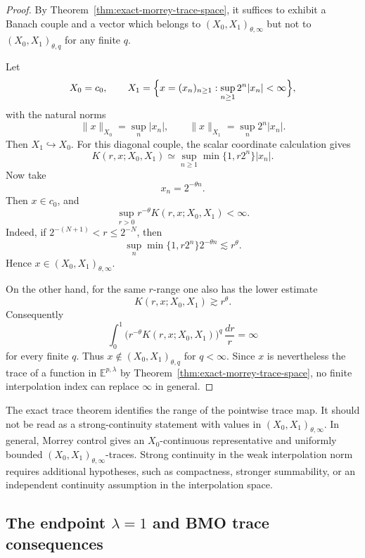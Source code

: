 \documentclass[smallextended,envcountsect,envcountsame]{svjour3}
\begin{document}
	\begin{proof}
	By Theorem~\ref{thm:exact-morrey-trace-space}, it suffices to exhibit a Banach couple and a vector which belongs to \((X_0,X_1)_{\theta,\infty}\) but not to \((X_0,X_1)_{\theta,q}\) for any finite \(q\).

	Let
	\[
	X_0=c_0,
	\qquad
	X_1=\Bigl\{x=(x_n)_{n\ge1}:\sup_{n\ge1}2^n|x_n|<\infty\Bigr\},
	\]
	with the natural norms
	\[
	\|x\|_{X_0}=\sup_n |x_n|,
	\qquad
	\|x\|_{X_1}=\sup_n 2^n|x_n|.
	\]
	Then \(X_1\hookrightarrow X_0\).  For this diagonal couple, the scalar coordinate calculation gives
	\[
	K(r,x;X_0,X_1)
	\simeq
	\sup_{n\ge1}\min\{1,r2^n\}|x_n|.
	\]
	Now take
	\[
	x_n=2^{-\theta n}.
	\]
	Then \(x\in c_0\), and
	\[
	\sup_{r>0}r^{-\theta}K(r,x;X_0,X_1)<\infty.
	\]
	Indeed, if \(2^{-(N+1)}<r\le2^{-N}\), then
	\[
	\sup_n \min\{1,r2^n\}2^{-\theta n}
	\lesssim r^\theta.
	\]
	Hence \(x\in (X_0,X_1)_{\theta,\infty}\).

	On the other hand, for the same \(r\)-range one also has the lower estimate
	\[
	K(r,x;X_0,X_1)
	\gtrsim r^\theta.
	\]
	Consequently
	\[
	\int_0^1\bigl(r^{-\theta}K(r,x;X_0,X_1)\bigr)^q\,\frac{dr}{r}
	=\infty
	\]
	for every finite \(q\).  Thus \(x\notin (X_0,X_1)_{\theta,q}\) for \(q<\infty\).  Since \(x\) is nevertheless the trace of a function in \(\mathbb E^{p,\lambda}\) by Theorem~\ref{thm:exact-morrey-trace-space}, no finite interpolation index can replace \(\infty\) in general.
	\end{proof}

	\begin{remark}\label{rem:no-continuity-trace-space}
	The exact trace theorem identifies the range of the pointwise trace map.  It should not be read as a strong-continuity statement with values in \((X_0,X_1)_{\theta,\infty}\).  In general, Morrey control gives an \(X_0\)-continuous representative and uniformly bounded \((X_0,X_1)_{\theta,\infty}\)-traces.  Strong continuity in the weak interpolation norm requires additional hypotheses, such as compactness, stronger summability, or an independent continuity assumption in the interpolation space.
	\end{remark}

	

	\subsection{The endpoint \texorpdfstring{$\lambda=1$}{lambda=1} and BMO trace consequences}\label{subsec:endpoint-lambda-one}
\end{document}
